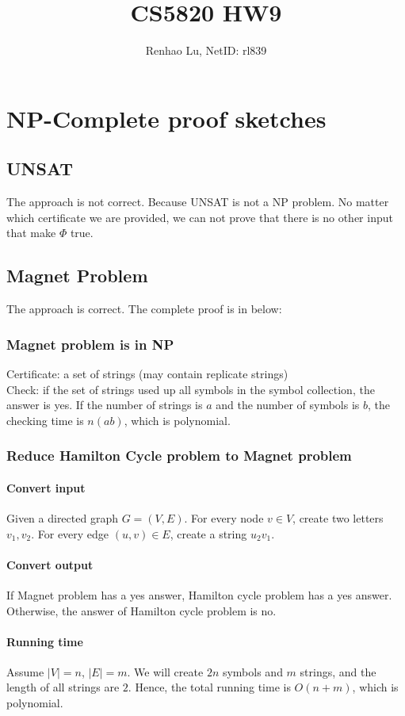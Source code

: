 \documentclass{article}
\title{CS5820 HW9}
\author{Renhao Lu, NetID: rl839}
\begin{document}
	\maketitle
	
	\section{NP-Complete proof sketches}
	\subsection{UNSAT}
	The approach is not correct. Because UNSAT is not a NP problem. No matter which certificate we are provided, we can not prove that there is no other input that make $\Phi$ true. 
	\subsection{Magnet Problem}
	The approach is correct. The complete proof is in below:
	\subsubsection{Magnet problem is in NP}
	Certificate: a set of strings (may contain replicate strings)\\
	Check: if the set of strings used up all symbols in the symbol collection, the answer is yes. If the number of strings is $a$ and the number of symbols is $b$, the checking time is $n(ab)$, which is polynomial.
	\subsubsection{Reduce Hamilton Cycle problem to Magnet problem}
	\paragraph{Convert input}
	Given a directed graph $G=(V,E)$. For every node $v\in V$, create two letters $v_1,v_2$. For every edge $(u,v)\in E$, create a string $u_2v_1$.
	\paragraph{Convert output}
	If Magnet problem has a yes answer, Hamilton cycle problem has a yes answer. Otherwise, the answer of Hamilton cycle problem is no.
	\paragraph{Running time}
	Assume $|V|=n$, $|E|=m$. We will create $2n$ symbols and $m$ strings, and the length of all strings are $2$. Hence, the total running time is $O(n+m)$, which is polynomial.
\end{document}
